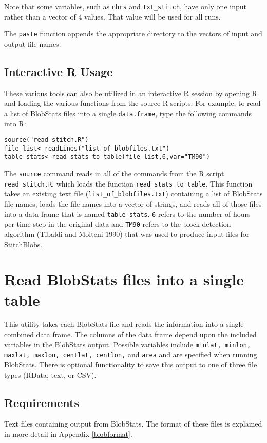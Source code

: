 \documentclass{article}
\begin{document}
Note that some variables, such as \texttt{nhrs} and \texttt{txt\_stitch}, have only one input rather than a vector of 4 values. That value will be used for all runs.

The \texttt{paste} function appends the appropriate directory to the vectors of input and output file names.


\subsection{Interactive R Usage}
These various tools can also be utilized in an interactive R session by opening R and loading the various functions from the source R scripts. For example, to read a list of BlobStats files into a single \texttt{data.frame}, type the following commands into R:

\begin{verbatim}
source("read_stitch.R")
file_list<-readLines("list_of_blobfiles.txt")
table_stats<-read_stats_to_table(file_list,6,var="TM90")
\end{verbatim}

The \texttt{source} command reads in all of the commands from the R script \texttt{read\_stitch.R}, which loads the function \texttt{read\_stats\_to\_table}. This function takes an existing text file (\texttt{list\_of\_blobfiles.txt}) containing a list of BlobStats file names, loads the file names into a vector of strings, and reads all of those files into a data frame that is named \texttt{table\_stats}. \texttt{6} refers to the number of hours per time step in the original data and \texttt{TM90} refers to the block detection algorithm (Tibaldi and Molteni 1990) that was used to produce input files for StitchBlobs. 

\section{Read BlobStats files into a single table}\label{readfiles}
This utility takes each BlobStats file and reads the information into a single combined data frame. The columns of the data frame depend upon the included variables in the BlobStats output. Possible variables include \texttt{minlat, minlon, maxlat, maxlon, centlat, centlon,} and \texttt{area} and are specified when running BlobStats. There is optional functionality to save this output to one of three file types (RData, text, or CSV).

\subsection{Requirements}
Text files containing output from BlobStats. The format of these files is explained in more detail in Appendix \ref{blobformat}.
\end{document}
